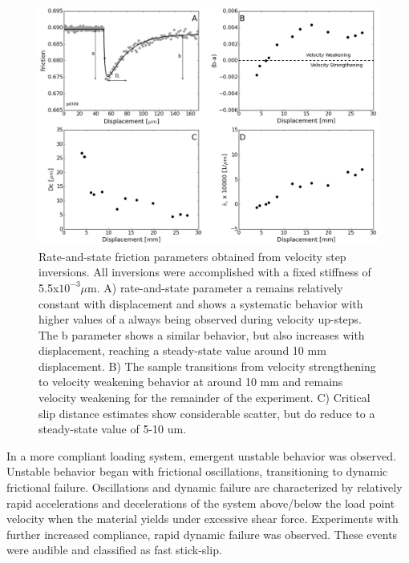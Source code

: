 \documentclass[11pt]{article}
\begin{document}
\begin{figure}
    \centering
        \includegraphics[scale=0.45]{../Figures/Fig_RSF_Parameters/RSF_Parameters.png}
       \caption{Rate-and-state friction parameters obtained from velocity step
       inversions. All inversions were accomplished with a fixed stiffness of
       5.5x$10 ^ {-3} \mu$m. A) rate-and-state parameter a remains relatively
       constant with displacement and shows a systematic behavior with higher
       values of a always being observed during velocity up-steps. The b
       parameter shows a similar behavior, but also increases with displacement,
       reaching a steady-state value around 10 mm displacement. B) The sample
       transitions from velocity strengthening to velocity weakening  behavior
       at around 10 mm and remains velocity weakening for the remainder of  the
       experiment. C) Critical slip distance estimates show considerable
       scatter,  but do reduce to a steady-state value of 5-10 um.  }
      \label{Figure:RSF Props}
\end{figure}

In a more compliant loading system, emergent unstable behavior was observed.
Unstable behavior began with frictional oscillations, transitioning to dynamic frictional
failure. Oscillations and dynamic failure are characterized by relatively rapid
accelerations and decelerations of the system above/below the load point
velocity when the material yields under excessive shear force. Experiments with
further increased compliance, rapid dynamic failure was observed. These events
were audible and classified as fast stick-slip.
\end{document}
